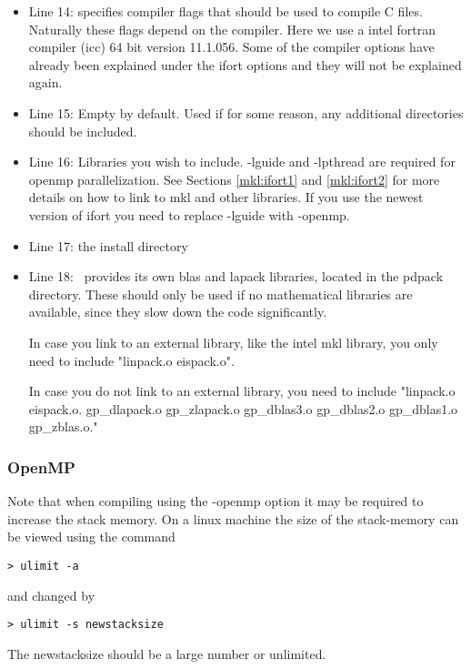 \begin{itemize}
\item Line 14:  specifies compiler flags that should be used to compile C files. Naturally these flags depend on the compiler. Here we use a intel fortran compiler (icc) 64 bit version 11.1.056. Some of the compiler options have already been explained under the ifort options and they will not be explained again.
\item Line 15: Empty by default. Used if for some reason, any additional directories should be included.
\item Line 16: Libraries you wish to include. -lguide and -lpthread are required for openmp parallelization. See Sections \ref{mkl:ifort1} and \ref{mkl:ifort2} for more details on how to link to mkl and other libraries. If you use the newest version of ifort you need to replace -lguide with -openmp. 
\item Line 17: the install directory 
\item Line 18: \lsdalton\ provides its own blas and lapack libraries, located in the pdpack directory. These should only be used
if no mathematical libraries are available, since they slow down the code significantly. 

In case you link to an external library, like the intel mkl library, you only need to include "linpack.o eispack.o".

In case you do not link to an external library, you need to include "linpack.o eispack.o. gp\_dlapack.o gp\_zlapack.o gp\_dblas3.o gp\_dblas2.o gp\_dblas1.o gp\_zblas.o."
\end{itemize}

\subsubsection{OpenMP}
Note that when compiling using the -openmp option it may be required to increase the stack memory. On a linux machine the size of the stack-memory can be viewed using the command
\begin{verbatim}
> ulimit -a
\end{verbatim}
and changed by
\begin{verbatim}
> ulimit -s newstacksize
\end{verbatim}
The newstacksize should be a large number or unlimited.

